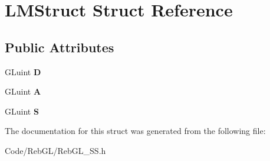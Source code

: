 \hypertarget{struct_l_m_struct}{}\section{L\+M\+Struct Struct Reference}
\label{struct_l_m_struct}
\subsection*{Public Attributes}
\begin{DoxyCompactItemize}
\item 
G\+Luint {\bfseries D}\hypertarget{struct_l_m_struct_ad1d582ce9c80db4310f23bd7c478ce89}{}\label{struct_l_m_struct_ad1d582ce9c80db4310f23bd7c478ce89}

\item 
G\+Luint {\bfseries A}\hypertarget{struct_l_m_struct_ac4bee4c141c9f7f08c2b39f70cf9e479}{}\label{struct_l_m_struct_ac4bee4c141c9f7f08c2b39f70cf9e479}

\item 
G\+Luint {\bfseries S}\hypertarget{struct_l_m_struct_a68f6c6514283ae0fda24037968c70a72}{}\label{struct_l_m_struct_a68f6c6514283ae0fda24037968c70a72}

\end{DoxyCompactItemize}


The documentation for this struct was generated from the following file\+:\begin{DoxyCompactItemize}
\item 
Code/\+Reb\+G\+L/Reb\+G\+L\+\_\+\+S\+S.\+h\end{DoxyCompactItemize}
